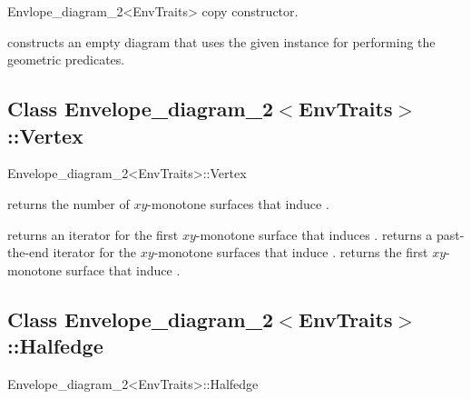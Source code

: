 \begin{ccRefClass}{Envlope_diagram_2<EnvTraits>}
    {copy constructor.}
        
    {constructs an empty diagram that uses the given 
     instance for performing the geometric predicates.}


\subsection*{Class Envelope\_diagram\_2$<$EnvTraits$>$::Vertex}

\begin{ccClass}{Envelope_diagram_2<EnvTraits>::Vertex}

\ccInheritsFrom

\ccAccessFunctions

{returns the number of $xy$-monotone surfaces that induce \ccVar.}

{returns an iterator for the first $xy$-monotone surface that induces \ccVar.}
\ccGlue
{}
{returns a past-the-end iterator for the $xy$-monotone surfaces that induce
 \ccVar.}
{returns the first $xy$-monotone surface that induce \ccVar.
 }

\end{ccClass}


\subsection*{Class Envelope\_diagram\_2$<$EnvTraits$>$::Halfedge}

\begin{ccClass}{Envelope_diagram_2<EnvTraits>::Halfedge}

\ccInheritsFrom

\ccAccessFunctions


\end{ccClass}
\end{ccRefClass}
